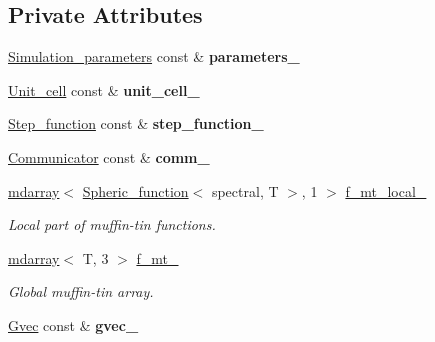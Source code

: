 \subsection*{Private Attributes}
\begin{DoxyCompactItemize}
\item 
\hypertarget{classsirius_1_1_periodic__function_a21d72139136aaa74229b38cf5c6b6c32}{}\hyperlink{classsirius_1_1_simulation__parameters}{Simulation\+\_\+parameters} const \& {\bfseries parameters\+\_\+}\label{classsirius_1_1_periodic__function_a21d72139136aaa74229b38cf5c6b6c32}

\item 
\hypertarget{classsirius_1_1_periodic__function_aa79dbabf05d0763c2402d4901f132f32}{}\hyperlink{classsirius_1_1_unit__cell}{Unit\+\_\+cell} const \& {\bfseries unit\+\_\+cell\+\_\+}\label{classsirius_1_1_periodic__function_aa79dbabf05d0763c2402d4901f132f32}

\item 
\hypertarget{classsirius_1_1_periodic__function_a1dd6de650fd4b8b35c20d7a4a38c7883}{}\hyperlink{classsirius_1_1_step__function}{Step\+\_\+function} const \& {\bfseries step\+\_\+function\+\_\+}\label{classsirius_1_1_periodic__function_a1dd6de650fd4b8b35c20d7a4a38c7883}

\item 
\hypertarget{classsirius_1_1_periodic__function_a8a54d4ed18c555d0e71c967753debd88}{}\hyperlink{classsddk_1_1_communicator}{Communicator} const \& {\bfseries comm\+\_\+}\label{classsirius_1_1_periodic__function_a8a54d4ed18c555d0e71c967753debd88}

\item 
\hyperlink{classsddk_1_1mdarray}{mdarray}$<$ \hyperlink{classsirius_1_1_spheric__function}{Spheric\+\_\+function}$<$ spectral, T $>$, 1 $>$ \hyperlink{classsirius_1_1_periodic__function_afcea2d8d52eadb829c6208e6701b9c11}{f\+\_\+mt\+\_\+local\+\_\+}
\begin{DoxyCompactList}\small\item\em Local part of muffin-\/tin functions. \end{DoxyCompactList}\item 
\hyperlink{classsddk_1_1mdarray}{mdarray}$<$ T, 3 $>$ \hyperlink{classsirius_1_1_periodic__function_ad94fec4be54aabdb4d803d2864c71da3}{f\+\_\+mt\+\_\+}
\begin{DoxyCompactList}\small\item\em Global muffin-\/tin array. \end{DoxyCompactList}\item 
\hypertarget{classsirius_1_1_periodic__function_a51f78ed960b90f5726356098d295ae0b}{}\hyperlink{classsddk_1_1_gvec}{Gvec} const \& {\bfseries gvec\+\_\+}\label{classsirius_1_1_periodic__function_a51f78ed960b90f5726356098d295ae0b}


\end{DoxyCompactItemize}
